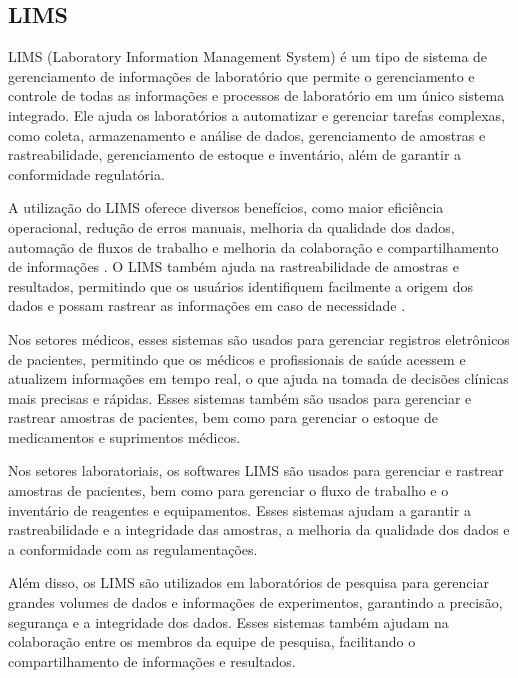 \subsection{LIMS}


LIMS (Laboratory Information Management System) é um tipo de sistema de gerenciamento de informações de laboratório que permite o gerenciamento e controle de todas as informações e processos de laboratório em um único sistema integrado. Ele ajuda os laboratórios a automatizar e gerenciar tarefas complexas, como coleta, armazenamento e análise de dados, gerenciamento de amostras e rastreabilidade, gerenciamento de estoque e inventário, além de garantir a conformidade regulatória.


A utilização do LIMS oferece diversos benefícios, como maior eficiência operacional, redução de erros manuais, melhoria da qualidade dos dados, automação de fluxos de trabalho e melhoria da colaboração e compartilhamento de informações \cite{Key2011}. O LIMS também ajuda na rastreabilidade de amostras e resultados, permitindo que os usuários identifiquem facilmente a origem dos dados e possam rastrear as informações em caso de necessidade \R.


Nos setores médicos, esses sistemas são usados para gerenciar registros eletrônicos de pacientes, permitindo que os médicos e profissionais de saúde acessem e atualizem informações em tempo real, o que ajuda na tomada de decisões clínicas mais precisas e rápidas. Esses sistemas também são usados para gerenciar e rastrear amostras de pacientes, bem como para gerenciar o estoque de medicamentos e suprimentos médicos.

Nos setores laboratoriais, os softwares LIMS são usados para gerenciar e rastrear amostras de pacientes, bem como para gerenciar o fluxo de trabalho e o inventário de reagentes e equipamentos. Esses sistemas ajudam a garantir a rastreabilidade e a integridade das amostras, a melhoria da qualidade dos dados e a conformidade com as regulamentações.

Além disso, os LIMS são utilizados em laboratórios de pesquisa para gerenciar grandes volumes de dados e informações de experimentos, garantindo a precisão, segurança e a integridade dos dados. Esses sistemas também ajudam na colaboração entre os membros da equipe de pesquisa, facilitando o compartilhamento de informações e resultados.


